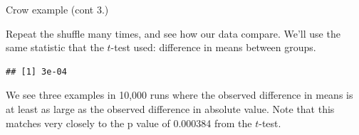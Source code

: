 \documentclass[
  ignorenonframetext,
]{beamer}
\newenvironment{Shaded}{\begin{snugshade}}{\end{snugshade}}
\newcommand{\ControlFlowTok}[1]{\textcolor[rgb]{0.13,0.29,0.53}{\textbf{#1}}}
\newcommand{\DecValTok}[1]{\textcolor[rgb]{0.00,0.00,0.81}{#1}}
\newcommand{\KeywordTok}[1]{\textcolor[rgb]{0.13,0.29,0.53}{\textbf{#1}}}
\newcommand{\NormalTok}[1]{#1}
\newcommand{\OperatorTok}[1]{\textcolor[rgb]{0.81,0.36,0.00}{\textbf{#1}}}
\newcommand{\StringTok}[1]{\textcolor[rgb]{0.31,0.60,0.02}{#1}}
\begin{document}
\begin{frame}[fragile]{Crow example (cont 3.)}
\protect\hypertarget{crow-example-cont-3.}{}

Repeat the shuffle many times, and see how our data compare. We'll use
the same statistic that the \(t\)-test used: difference in means between
groups.

\scriptsize

\begin{Shaded}
\end{Shaded}

\begin{verbatim}
## [1] 3e-04
\end{verbatim}

\normalsize

We see three examples in 10,000 runs where the observed difference in
means is at least as large as the observed difference in absolute value.
Note that this matches very closely to the p value of 0.000384 from the
\(t\)-test.

\end{frame}
\end{document}

